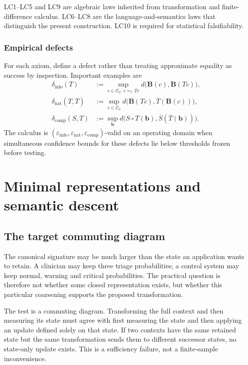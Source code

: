 \documentclass[11pt]{article}
\newcommand{\Ctxt}{\mathcal C}
\newcommand{\Bmap}{\mathbf B}
\begin{document}
LC1--LC5 and LC9 are algebraic laws inherited from transformation and finite-difference calculus. LC6--LC8 are the language-and-semantics laws that distinguish the present construction. LC10 is required for statistical falsifiability.

\subsubsection{Empirical defects}

For each axiom, define a defect rather than treating approximate equality as success by inspection. Important examples are
\begin{align*}
 \delta_{\mathrm{info}}(T)
 &:=\sup_{c\in\Ctxt_0:\,c\simeq_{\mathcal I}Tc}
 d\bigl(\Bmap(c),\Bmap(Tc)\bigr),\\
 \delta_{\mathrm{nat}}(T,\overline T)
 &:=\sup_{c\in\Ctxt_0}
 d\bigl(\Bmap(Tc),\overline T(\Bmap(c))\bigr),\\
 \delta_{\mathrm{comp}}(S,T)
 &:=\sup_{\bm b}
 d\bigl(\overline{S\circ T}(\bm b),
          \overline S(\overline T(\bm b))\bigr).
\end{align*}
The calculus is $(\varepsilon_{\mathrm{info}},\varepsilon_{\mathrm{nat}},\varepsilon_{\mathrm{comp}})$-valid on an operating domain when simultaneous confidence bounds for these defects lie below thresholds frozen before testing.

\section{Minimal representations and semantic descent}

\subsection{The target commuting diagram}

The canonical signature may be much larger than the state an application
wants to retain.  A clinician may keep three triage probabilities; a control
system may keep normal, warning and critical probabilities.  The practical
question is therefore not whether some closed representation exists, but
whether this particular coarsening supports the proposed transformation.

The test is a commuting diagram.  Transforming the full context and then
measuring its state must agree with first measuring the state and then
applying an update defined solely on that state.  If two contexts have the
same retained state but the same transformation sends them to different
successor states, no state-only update exists.  This is a sufficiency failure,
not a finite-sample inconvenience.
\end{document}
